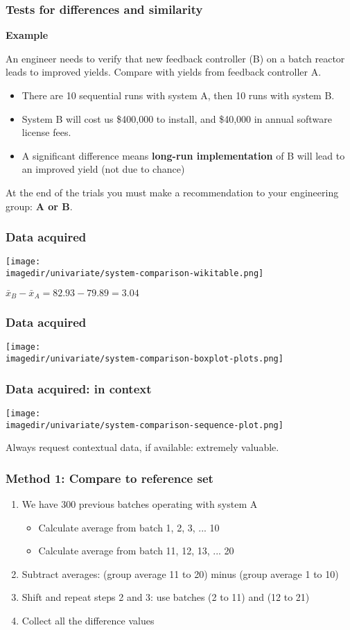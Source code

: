 \begin{frame}\frametitle{Tests for differences and similarity}

	\textbf{Example}

	An engineer needs to verify that new feedback controller (B) on a batch reactor leads to improved yields. Compare with yields from feedback controller A.
	\begin{itemize}
		\item	There are 10 sequential runs with system A, then 10 runs with system B.
		\item	System B will cost us \$400,000 to install, and \$40,000 in annual software license fees.
		\item	A significant difference means \textbf{long-run implementation} of B will lead to an improved yield (not due to chance)
	\end{itemize}

	At the end of the trials you must make a recommendation to your engineering group: \textbf{A or B}.
\end{frame}

\begin{frame}\frametitle{Data acquired}
	\texttt{[image: \\imagedir/univariate/system-comparison-wikitable.png]}
	
	\vspace{12pt}
	$\bar{x}_B - \bar{x}_A = 82.93 - 79.89 = 3.04$
\end{frame}

\begin{frame}\frametitle{Data acquired}
	\texttt{[image: \\imagedir/univariate/system-comparison-boxplot-plots.png]}
\end{frame}

\begin{frame}\frametitle{Data acquired: in context}
	\texttt{[image: \\imagedir/univariate/system-comparison-sequence-plot.png]}
	
	\vspace{0pt}
	Always request contextual data, if available: extremely valuable. {\color{myOrange}{Let's see why.}}
\end{frame}

\begin{frame}\frametitle{Method 1: Compare to reference set}
	\begin{enumerate}
		\item	We have 300 previous batches operating with system A
		\begin{itemize}
			\item	Calculate average from batch 1, 2, 3, ... 10
			\item	Calculate average from batch 11, 12, 13, ... 20
		\end{itemize}
		\item	Subtract averages: (group average 11 to 20) minus (group average 1 to 10)
		\item	Shift and repeat steps 2 and 3: use batches (2 to 11) and (12 to 21)
		\item	Collect all the difference values
	\end{enumerate}
\end{frame}


